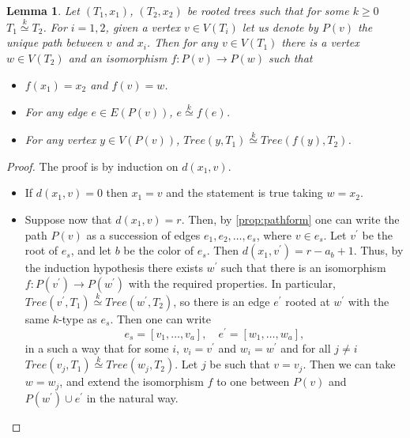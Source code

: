 \documentclass[11pt,notitlepage,a4paper]{article}
\newtheorem{lemma}{Lemma}[section]
\theoremstyle{definition}
\newcommand{\morph}[1]{\stackrel{#1}{\simeq}}
\begin{document}
\begin{lemma} \label{lem:path}
	Let $(T_1,x_1)$, $(T_2,x_2)$ be rooted trees such that for some $k\geq 0$
	$T_1\morph{k} T_2$. For $i=1,2$, given a vertex $v\in V(T_i)$ let us denote by
	$P(v)$ the unique path between $v$ and $x_i$.
	Then for any $v\in V(T_1)$ there is a vertex $w\in V(T_2)$ and an isomorphism
	$f:P(v)\rightarrow P(w)$ such that
	\begin{itemize}
		\item[(1)]  $f(x_1)=x_2$ and $f(v)=w$.
		\item[(2)] For any edge $e\in E(P(v))$, $e\morph{k} f(e)$.
		\item[(3)] For any vertex $y\in V(P(v))$, $Tree(y,T_1)\morph{k} Tree(f(y),T_2)$.
	\end{itemize}
\end{lemma}
\begin{proof}
	The proof is by induction on $d(x_1, v)$.
	\begin{itemize}[leftmargin=*]
		\item If $d(x_1,v)=0$ then $x_1=v$ and the statement is true taking $w=x_2$.
		\item Suppose now that $d(x_1,v)=r$. Then, by
		\cref{prop:pathform} one can write the path $P(v)$ as a
		succession of edges $e_1,e_2,\dots, e_s$, where $v\in e_s$.
		Let $v^\prime$ be the root of $e_s$, and let $b$ be the color
		of $e_s$.
		Then $d(x_1,v^\prime)=r-a_b+1$.
		Thus, by the
		induction hypothesis there exists $w^\prime$ such that there is an isomorphism
		$f: P(v^\prime)\rightarrow P(w^\prime)$ with the required properties. 
		In particular, $Tree(v^\prime,T_1)\morph{k}Tree(w^\prime,T_2)$, so there is an
		edge $e^\prime$ rooted at $w^\prime$ with the same $k$-type as $e_s$. Then one can write
		\[e_s=[v_1,\dots,v_a], \quad  e^\prime=[w_1,\dots,w_a], \]
		in a such a way that for some $i$, $v_i=v^\prime$ and $w_i=w^\prime$ and for all $j\neq i$
		$Tree(v_j,T_1)\morph{k} Tree(w_j,T_2)$. Let $j$ be such that $v=v_j$. Then we can take
		$w=w_j$, and extend the isomorphism $f$ to one between $P(v)$ and
		$P(w^\prime)\cup e^\prime$
		in the natural way. 
	\end{itemize}
\end{proof}
\end{document}

